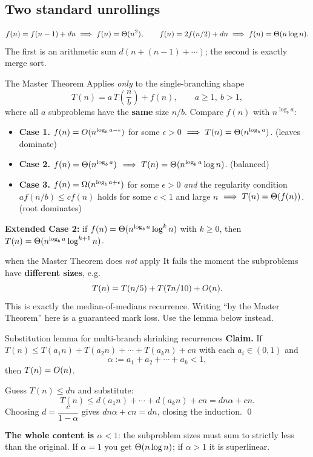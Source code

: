\subsection*{Two standard unrollings}
\[
  f(n)=f(n-1)+dn \implies f(n)=\Theta(n^2),
  \qquad
  f(n)=2f(n/2)+dn \implies f(n)=\Theta(n\log n).
\]
The first is an arithmetic sum $d(n+(n-1)+\cdots)$; the second is exactly merge sort.

\begin{facts}{The Master Theorem}
Applies \emph{only} to the single-branching shape
\[
  T(n)=a\,T\!\left(\frac nb\right)+f(n),\qquad a\ge1,\ b>1,
\]
where all $a$ subproblems have the \textbf{same} size $n/b$. Compare $f(n)$ with $n^{\log_b a}$:
\begin{itemize}
  \item \textbf{Case 1.} $f(n)=O(n^{\log_b a-\epsilon})$ for some $\epsilon>0$
        $\implies T(n)=\Theta(n^{\log_b a})$. \hfill(leaves dominate)
  \item \textbf{Case 2.} $f(n)=\Theta(n^{\log_b a})$ $\implies T(n)=\Theta(n^{\log_b a}\log n)$.
        \hfill(balanced)
  \item \textbf{Case 3.} $f(n)=\Omega(n^{\log_b a+\epsilon})$ for some $\epsilon>0$ \emph{and} the
        regularity condition $a f(n/b)\le c f(n)$ holds for some $c<1$ and large $n$
        $\implies T(n)=\Theta(f(n))$. \hfill(root dominates)
\end{itemize}
\textbf{Extended Case 2:} if $f(n)=\Theta(n^{\log_b a}\log^k n)$ with $k\ge0$, then
$T(n)=\Theta(n^{\log_b a}\log^{k+1}n)$.
\end{facts}

\begin{trap}{when the Master Theorem does \emph{not} apply}
It fails the moment the subproblems have \textbf{different sizes}, e.g.
\[
  T(n)=T(n/5)+T(7n/10)+O(n) .
\]
This is exactly the median-of-medians recurrence. Writing ``by the Master Theorem'' here is a
guaranteed mark loss. Use the lemma below instead.
\end{trap}

\begin{facts}{Substitution lemma for multi-branch shrinking recurrences}
\textbf{Claim.} If $T(n)\le T(a_1n)+T(a_2n)+\cdots+T(a_kn)+cn$ with each $a_i\in(0,1)$ and
\[
  \alpha:=a_1+a_2+\cdots+a_k<1,
\]
then $T(n)=O(n)$.

\prf Guess $T(n)\le dn$ and substitute:
\[
  T(n)\le d(a_1n)+\cdots+d(a_kn)+cn=dn\alpha+cn .
\]
Choosing $d=\dfrac{c}{1-\alpha}$ gives $dn\alpha+cn=dn$, closing the induction. \qed

\textbf{The whole content is $\alpha<1$}: the subproblem sizes must sum to strictly less than
the original. If $\alpha=1$ you get $\Theta(n\log n)$; if $\alpha>1$ it is superlinear.
\end{facts}

